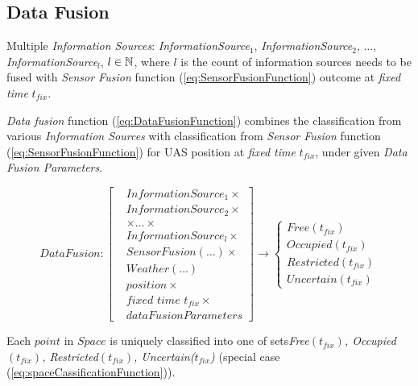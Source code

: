 \subsection{Data Fusion}\label{s:dataFusionDefinition}
    \noindent Multiple \emph{Information Sources}: \emph{InformationSource}$_1$, \emph{InformationSource}$_2$, $\dots$, \emph{InformationSource}$_l$, $l\in\mathbb{N}$, where $l$ is the count of information sources needs to be fused with \emph{Sensor Fusion} function (\ref{eq:SensorFusionFunction}) outcome at \emph{fixed time} $t_{fix}$.

    \emph{Data fusion} function (\ref{eq:DataFusionFunction}) combines the classification from various \emph{Information Sources} with classification from \emph{Sensor Fusion} function (\ref{eq:SensorFusionFunction}) for UAS position at \emph{fixed time} $t_{fix}$, under given \emph{Data Fusion Parameters}. 

    \begin{equation}\label{eq:DataFusionFunction}
        DataFusion:
        \left[
        \begin{aligned}
            &InformationSource_1 \times\\
            &InformationSource_2 \times\\
            &\times\dots\times\\
            &InformationSource_l \times\\
            &SensorFusion(\dots)\times\\
            &Weather(\dots)\\
            &position\times\\
            &\textit{fixed time }t_{fix}\times\\
            &dataFusionParameters
        \end{aligned}
        \right]
        \to 
        \begin{cases}
            Free(t_{fix})\\
            Occupied(t_{fix})\\
            Restricted(t_{fix})\\
            Uncertain(t_{fix})
        \end{cases}
    \end{equation}

    Each $point$ in $Space$ is uniquely classified into one of sets\emph{Free$(t_{fix})$, Occupied$(t_{fix})$, Restricted$(t_{fix})$, Uncertain($t_{fix}$)} (special case (\ref{eq:spaceCassificationFunction})).
    
